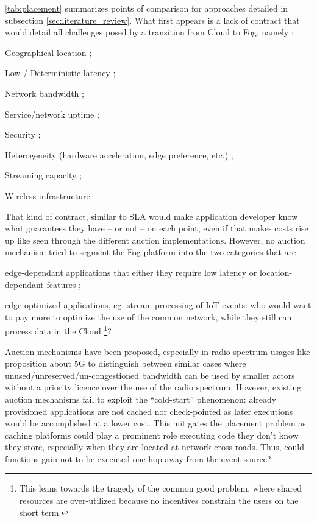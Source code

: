 \documentclass[11pt]{sdm}
\begin{document}
\cref{tab:placement} summarizes points of comparison for approaches detailed in subsection \cref{sec:literature_review}. What first appears is a lack of contract that would detail all challenges posed by a transition from Cloud to Fog, namely \cite{chiang_fog_2016, bonomi_fog_2012}:
\begin{enumerate*}[(I)]
	\item Geographical location ;
	\item Low / Deterministic latency ;
	\item Network bandwidth ;
	\item Service/network uptime ;
	\item Security ;
	\item Heterogeneity (hardware acceleration, edge preference, etc.) ;
	\item Streaming capacity ;
	\item Wireless infrastructure.
\end{enumerate*}
That kind of contract, similar to \gls{SLA} would make application developer know what guarantees they have -- or not -- on each point, even if that makes costs rise up like seen through the different auction implementations. However, no auction mechanism tried to segment the Fog platform into the two categories that are 
\begin{enumerate*}[(A)]
	\item edge-dependant applications that either they require low latency or location-dependant features ;
	\item edge-optimized applications, eg. stream processing of \gls{IoT} events: who would want to pay more to optimize the use of the common network, while they still can process data in the Cloud \footnote{This leans towards the tragedy of the common good problem, where shared resources are over-utilized because no incentives constrain the users on the short term.}?
\end{enumerate*}
Auction mechanisms have been proposed, especially in radio spectrum usages like  proposition about 5G to distinguish between similar cases where unused/unreserved/un-congestioned bandwidth can be used by smaller actors without a priority licence over the use of the radio spectrum.
However, existing auction mechanisms fail to exploit the ``cold-start'' phenomenon: already provisioned applications are not cached nor check-pointed as later executions would be accomplished at a lower cost. This mitigates the placement problem as caching platforms could play a prominent role executing code they don't know they store, especially when they are located at network cross-roads. Thus, could functions gain not to be executed one hop away from the event source?
\end{document}
